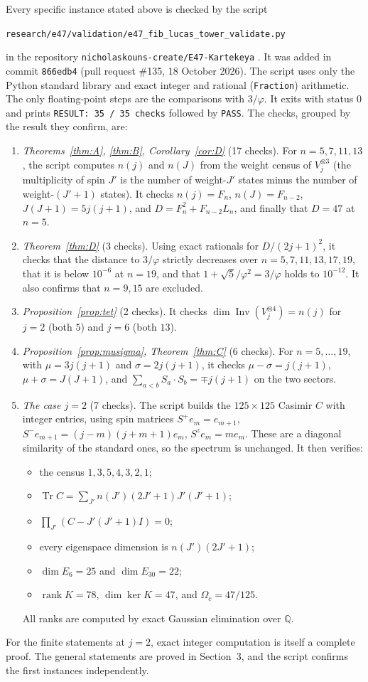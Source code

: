 \documentclass[11pt]{amsart}
\theoremstyle{definition}
\theoremstyle{remark}
\newcommand{\Inv}{\operatorname{Inv}}
\newcommand{\rank}{\operatorname{rank}}
\newcommand{\Tr}{\operatorname{Tr}}
\begin{document}
Every specific instance stated above is checked by the script
\begin{center}
\texttt{research/e47/validation/e47\_fib\_lucas\_tower\_validate.py}
\end{center}
in the repository \texttt{nicholaskouns-create/E47-Kartekeya} \cite{repo}. It was added in commit \texttt{866edb4} (pull request \#135, 18 October 2026). The script uses only the Python standard library and exact integer and rational (\texttt{Fraction}) arithmetic. The only floating-point steps are the comparisons with $3/\varphi$. It exits with status $0$ and prints \texttt{RESULT: 35 / 35 checks} followed by \texttt{PASS}. The checks, grouped by the result they confirm, are:
\begin{enumerate}
\item \emph{Theorems~\ref{thm:A}, \ref{thm:B}, Corollary~\ref{cor:D}} (17 checks). For $n=5,7,11,13$, the script computes $n(j)$ and $n(J)$ from the weight census of $V_j^{\otimes3}$ (the multiplicity of spin $J'$ is the number of weight-$J'$ states minus the number of weight-$(J'+1)$ states). It checks $n(j)=F_n$, $n(J)=F_{n-2}$, $J(J+1)=5j(j+1)$, and $D=F_n^2+F_{n-2}L_n$, and finally that $D=47$ at $n=5$.
\item \emph{Theorem~\ref{thm:D}} (3 checks). Using exact rationals for $D/(2j+1)^2$, it checks that the distance to $3/\varphi$ strictly decreases over $n=5,7,11,13,17,19$, that it is below $10^{-6}$ at $n=19$, and that $1+\sqrt5/\varphi^2=3/\varphi$ holds to $10^{-12}$. It also confirms that $n=9,15$ are excluded.
\item \emph{Proposition~\ref{prop:tet}} (2 checks). It checks $\dim\Inv(V_j^{\otimes4})=n(j)$ for $j=2$ (both $5$) and $j=6$ (both $13$).
\item \emph{Proposition~\ref{prop:musigma}, Theorem~\ref{thm:C}} (6 checks). For $n=5,\dots,19$, with $\mu=3j(j+1)$ and $\sigma=2j(j+1)$, it checks $\mu-\sigma=j(j+1)$, $\mu+\sigma=J(J+1)$, and $\sum_{a<b}S_a\cdot S_b=\mp j(j+1)$ on the two sectors.
\item \emph{The case $j=2$} (7 checks). The script builds the $125\times125$ Casimir $C$ with integer entries, using spin matrices $S^+e_m=e_{m+1}$, $S^-e_{m+1}=(j-m)(j+m+1)e_m$, $S^ze_m=me_m$. These are a diagonal similarity of the standard ones, so the spectrum is unchanged. It then verifies:
\begin{itemize}
\item the census $1,3,5,4,3,2,1$;
\item $\Tr C=\sum_{J'}n(J')(2J'+1)J'(J'+1)$;
\item $\prod_{J'}(C-J'(J'+1)I)=0$;
\item every eigenspace dimension is $n(J')(2J'+1)$;
\item $\dim E_6=25$ and $\dim E_{30}=22$;
\item $\rank K=78$, $\dim\ker K=47$, and $\Omega_c=47/125$.
\end{itemize}
All ranks are computed by exact Gaussian elimination over $\mathbb{Q}$.
\end{enumerate}
For the finite statements at $j=2$, exact integer computation is itself a complete proof. The general statements are proved in Section~3, and the script confirms the first instances independently.
\end{document}
